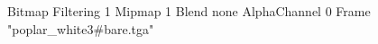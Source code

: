 {Bitmap
	{Filtering 1}
	{Mipmap 1}
	{Blend none}
	{AlphaChannel 0}
	{Frame "poplar_white3#bare.tga"}
}
